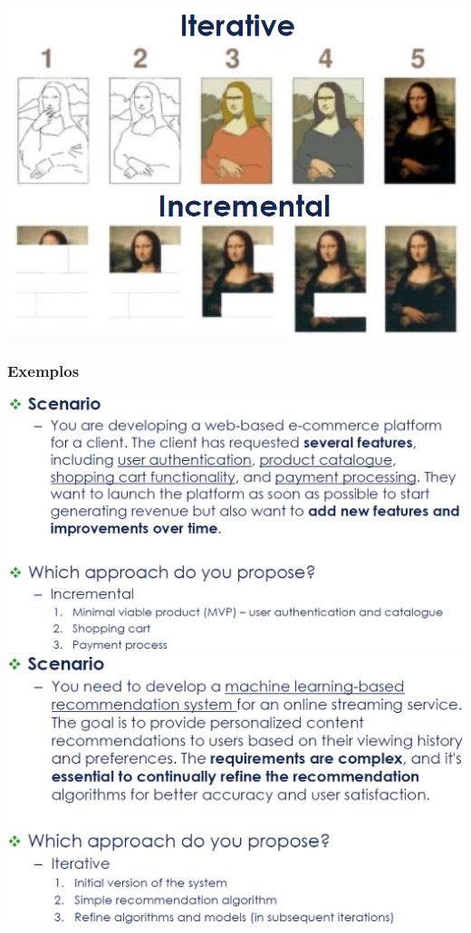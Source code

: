 \documentclass{article}
\begin{document}
\begin{center}
  \includegraphics[scale=0.5]{13}
\end{center}

\subsubsection{Exemplos}

\begin{center}
  \includegraphics[scale=0.32]{14}
  \includegraphics[scale=0.32]{15}
\end{center}
\end{document}
